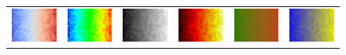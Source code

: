 \documentclass[review,journal]{vgtc}         %
\begin{document}
\begin{figure}
\begin{tabular}{c@{\;}c@{\;}c@{\;}c@{\;}c@{\;}c}
    \includegraphics[width=1.1in]{images/Cool2WarmHfNoise} &
    \includegraphics[width=1.1in]{images/RainbowHfNoise} &
    \includegraphics[width=1.1in]{images/GrayscaleHfNoise} &
    \includegraphics[width=1.1in]{images/BlackBodyHfNoise} &
    \includegraphics[width=1.1in]{images/Green2RedHfNoise} &
    \includegraphics[width=1.1in]{images/Blue2YellowHfNoise} \\


\end{tabular}
\end{figure}
\end{document}
